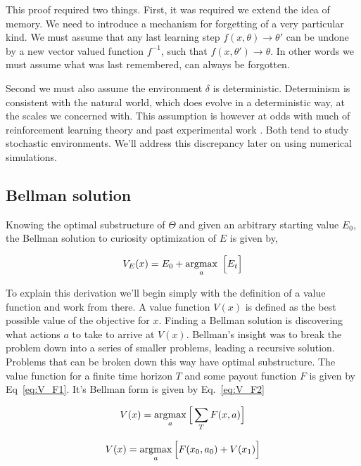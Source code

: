 This proof required two things. First, it was required we extend the idea of memory. We need to introduce a mechanism for forgetting of a very particular kind. We must assume that any last learning step $f(x, \theta) \rightarrow \theta'$ can be undone by a new vector valued function $f^{-1}$, such that $f(x, \theta') \rightarrow \theta$. In other words we must assume what was last remembered, can always be forgotten. 

Second we must also assume the environment $\delta$ is deterministic. Determinism is consistent with the natural world, which does evolve in a deterministic way, at the scales we concerned with. This assumption is however at odds with much of reinforcement learning theory \cite{needed} and past experimental work \cite{needed}. Both tend to study stochastic environments. We'll address this discrepancy later on using numerical simulations.

\subsection*{Bellman solution} Knowing the optimal substructure of $\Theta$ and given an arbitrary starting value $E_0$, the Bellman solution to curiosity optimization of $E$ is given by,

\begin{equation}
	\label{eq:V_E} 
	V_E(x) = E_0 + \operatorname*{argmax}_a \ \Big [ E_t \Big ] \\
\end{equation}

To explain this derivation we'll begin simply with the definition of a value function and work from there. A value function $V(x)$ is defined as the best possible value of the objective for $x$. Finding a Bellman solution is discovering what actions $a$ to take to arrive at $V(x)$. Bellman's insight was to break the problem down into a series of smaller problems, leading a recursive solution. Problems that can be broken down this way have optimal substructure. The value function for a finite time horizon $T$ and some payout function $F$ is given by Eq~\ref{eq:V_F1}. It's Bellman form is given by Eq.~\ref{eq:V_F2}

\begin{equation}
	\label{eq:V_F1}
	V(x) = \operatorname*{argmax}_a \Big [ \sum_T F(x, a) \Big ]
\end{equation}

\begin{equation}
	\label{eq:V_F2}
	V(x) = \operatorname*{argmax}_a \Big [ F(x_0, a_0) + V(x_1) \Big ]
\end{equation}

